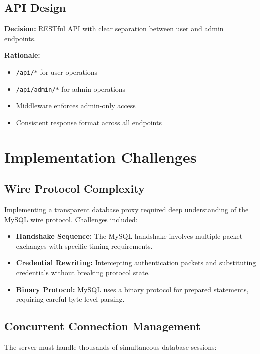 \subsection{API Design}

\textbf{Decision:} RESTful API with clear separation between user and admin endpoints.

\textbf{Rationale:}
\begin{itemize}
    \item \texttt{/api/*} for user operations
    \item \texttt{/api/admin/*} for admin operations
    \item Middleware enforces admin-only access
    \item Consistent response format across all endpoints
\end{itemize}


\section{Implementation Challenges}

\subsection{Wire Protocol Complexity}

Implementing a transparent database proxy required deep understanding of the MySQL wire protocol. Challenges included:

\begin{itemize}
    \item \textbf{Handshake Sequence:} The MySQL handshake involves multiple packet exchanges with specific timing requirements.
    \item \textbf{Credential Rewriting:} Intercepting authentication packets and substituting credentials without breaking protocol state.
    \item \textbf{Binary Protocol:} MySQL uses a binary protocol for prepared statements, requiring careful byte-level parsing.
\end{itemize}

\subsection{Concurrent Connection Management}

The server must handle thousands of simultaneous database sessions:

